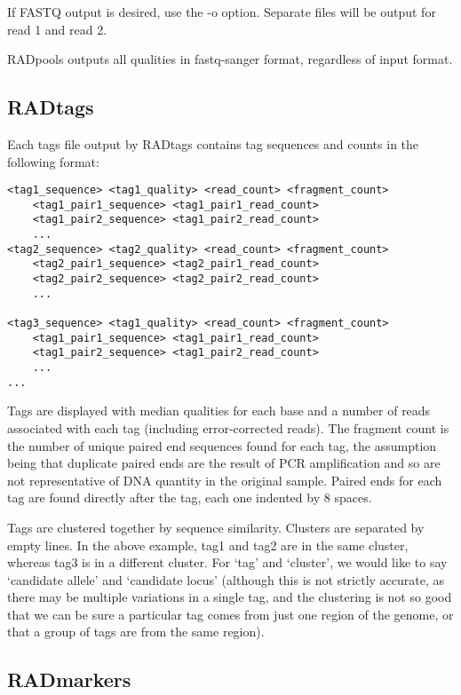 \documentclass[a4paper]{article}
\begin{document}
If FASTQ output is desired, use the -o option. Separate files will be output for read 1 and read 2.

RADpools outputs all qualities in fastq-sanger format, regardless of input format.

\subsection{RADtags}

Each tags file output by RADtags contains tag sequences and counts in the following format:

\begin{verbatim}
<tag1_sequence> <tag1_quality> <read_count> <fragment_count>
    <tag1_pair1_sequence> <tag1_pair1_read_count>
    <tag1_pair2_sequence> <tag1_pair2_read_count>
    ...
<tag2_sequence> <tag2_quality> <read_count> <fragment_count>
    <tag2_pair1_sequence> <tag2_pair1_read_count>
    <tag2_pair2_sequence> <tag2_pair2_read_count>
    ...

<tag3_sequence> <tag1_quality> <read_count> <fragment_count>
    <tag1_pair1_sequence> <tag1_pair1_read_count>
    <tag1_pair2_sequence> <tag1_pair2_read_count>
    ...
...
\end{verbatim}

Tags are displayed with median qualities for each base and a number of reads associated with each tag (including error-corrected reads). The fragment count is the number of unique paired end sequences found for each tag, the assumption being that duplicate paired ends are the result of PCR amplification and so are not representative of DNA quantity in the original sample. Paired ends for each tag are found directly after the tag, each one indented by 8 spaces.

Tags are clustered together by sequence similarity. Clusters are separated by empty lines. In the above example, tag1 and tag2 are in the same cluster, whereas tag3 is in a different cluster. For `tag' and `cluster', we would like to say `candidate allele' and `candidate locus' (although this is not strictly accurate, as there may be multiple variations in a single tag, and the clustering is not so good that we can be sure a particular tag comes from just one region of the genome, or that a group of tags are from the same region).


\subsection{RADmarkers}
\end{document}
